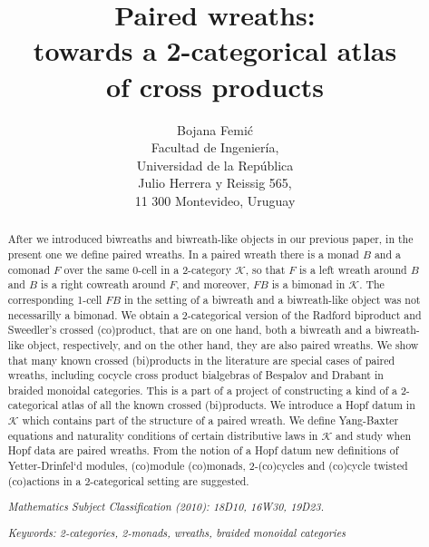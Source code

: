 \documentclass[a4paper, 12pt]{article}
\renewcommand{\_}[1]{\mbox{$_{\left( #1 \right)}$}}
\theoremstyle{plain}
\def\K{{\mathcal K}}  %
\begin{document}
\date{}


\title{Paired wreaths: \\ towards a 2-categorical atlas \\ of cross products}
\author{Bojana Femi\'c \vspace{6pt} \\
{\small Facultad de Ingenier\'ia, \vspace{-2pt}}\\
{\small  Universidad de la Rep\'ublica} \vspace{-2pt}\\
{\small  Julio Herrera y Reissig 565,} \vspace{-2pt}\\
{\small  11 300 Montevideo, Uruguay}}


\maketitle



\begin{abstract}
After we introduced biwreaths and biwreath-like objects in our previous paper, in the present one we define paired wreaths. 
In a paired wreath there is a monad $B$ and a comonad $F$ over the same 
0-cell in a 2-category $\K$, so that $F$ is a left wreath around $B$ and $B$ is a right cowreath around $F$, and moreover, $FB$ is a bimonad in $\K$. 
The corresponding 1-cell $FB$ in the setting of a biwreath and a biwreath-like object was not necessarilly a bimonad. 
We obtain a 2-categorical version of the Radford biproduct and Sweedler's crossed (co)product, that are on one hand, both a biwreath and a biwreath-like object, respectively, 
and on the other hand, they are also paired wreaths. We show that many known crossed (bi)products in the literature are special cases of paired wreaths, including 
cocycle cross product bialgebras of Bespalov and Drabant in braided monoidal categories. This is a part of a project of constructing a kind of a 2-categorical atlas of 
all the known crossed (bi)products. We introduce a Hopf datum in $\K$ which contains part of the structure of a paired wreath. We define Yang-Baxter equations and 
naturality conditions of certain distributive laws in $\K$ and study when Hopf data are paired wreaths. From the notion of a Hopf datum new definitions of 
Yetter-Drinfel`d modules, (co)module (co)monads, 2-(co)cycles and (co)cycle twisted (co)actions in a 2-categorical setting are suggested. 

\bigbreak
{\em Mathematics Subject Classification (2010): 18D10, 16W30, 19D23.}

{\em Keywords: 2-categories, 2-monads, wreaths, braided monoidal categories}
\end{abstract}
\end{document}
